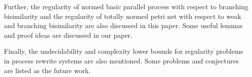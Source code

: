 \begin{englishabstract}
Further, the regularity of normed basic parallel process with respect to branching bisimilarity and the regularity of totally normed petri net with respect to weak and branching bisimilarity are also discussed in this paper. Some useful lemmas and proof ideas are discussed in our paper.

Finally, the undecidability and complexity lower bounds for regularity problems in process rewrite systems are also mentioned. Some problems and conjectures are listed as the future work.

\end{englishabstract}
